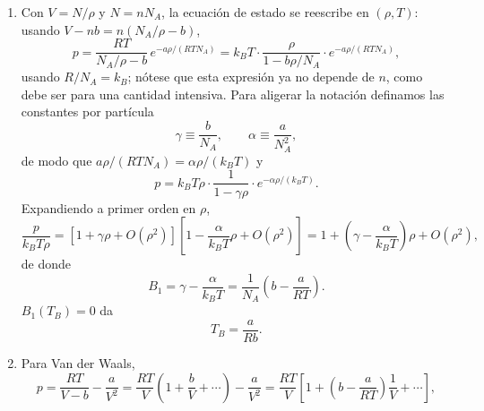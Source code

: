 \documentclass[12pt,a4paper]{article}
\newcommand{\paren}[1]{\left( #1 \right)}
\begin{document}
    \begin{solucion}
        \begin{enumerate}
            \item[1)] Con $V=N/\rho$ y $N=nN_{A}$, la ecuación de estado se reescribe en
            $(\rho,T)$: usando $V-nb=n(N_{A}/\rho-b)$,
            \begin{equation*}
                p=\frac{RT}{N_{A}/\rho-b}\,e^{-a\rho/(RTN_{A})}
                =k_{B}T\cdot\frac{\rho}{1-b\rho/N_{A}}\cdot e^{-a\rho/(RTN_{A})},
            \end{equation*}
            usando $R/N_{A}=k_{B}$; nótese que esta expresión ya no depende de $n$, como debe
            ser para una cantidad intensiva. Para aligerar la notación definamos las constantes
            por partícula
            \begin{equation*}
                \gamma\equiv\frac{b}{N_{A}}, \qquad \alpha\equiv\frac{a}{N_{A}^{2}},
            \end{equation*}
            de modo que $a\rho/(RTN_{A})=\alpha\rho/(k_{B}T)$ y
            \begin{equation*}
                p=k_{B}T\rho\cdot\frac{1}{1-\gamma\rho}\cdot e^{-\alpha\rho/(k_{B}T)}.
            \end{equation*}
            Expandiendo a primer orden en $\rho$,
            \begin{equation*}
                \frac{p}{k_{B}T\rho}=\left[1+\gamma\rho+O(\rho^{2})\right]\left[1-\frac{\alpha}{k_{B}T}\rho+O(\rho^{2})\right]
                =1+\paren{\gamma-\frac{\alpha}{k_{B}T}}\rho+O(\rho^{2}),
            \end{equation*}
            de donde
            \begin{equation*}
                \boxed{B_{1}=\gamma-\frac{\alpha}{k_{B}T}=\frac{1}{N_{A}}\paren{b-\frac{a}{RT}}.}
            \end{equation*}
            $B_{1}(T_{B})=0$ da
            \begin{equation*}
                \boxed{T_{B}=\frac{a}{Rb}.}
            \end{equation*}
            \item[2)] Para Van der Waals,
            \begin{equation*}
                p=\frac{RT}{V-b}-\frac{a}{V^{2}}
                =\frac{RT}{V}\paren{1+\frac{b}{V}+\cdots}-\frac{a}{V^{2}}
                =\frac{RT}{V}\left[1+\paren{b-\frac{a}{RT}}\frac1V+\cdots\right],
            \end{equation*}

\end{enumerate}
\end{solucion}
\end{document}

